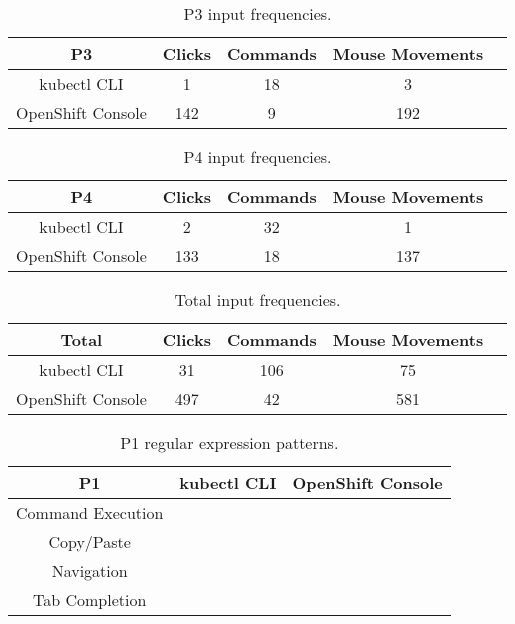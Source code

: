 \documentclass[11pt, oneside]{article}   	%
\begin{document}
\begin{table}
 \centering
  \begin{tabular}{ | c | c | c | c | c | } 
  \hline
  P3 & Clicks & Commands & Mouse Movements \\ 
  \hline
  kubectl CLI & 1 & 18 & 3 \\ 
  \hline
  OpenShift Console & 142 & 9 & 192 \\ 
  \hline
  \end{tabular}
 \caption{P3 input frequencies.}
 \label{table:t3}
\end{table}

\begin{table}
 \centering
  \begin{tabular}{ | c | c | c | c | c | } 
  \hline
  P4 & Clicks & Commands & Mouse Movements \\ 
  \hline
  kubectl CLI & 2 & 32 & 1 \\ 
  \hline
  OpenShift Console & 133 & 18 & 137 \\ 
  \hline
  \end{tabular}
 \caption{P4 input frequencies.}
 \label{table:t4}
\end{table}

\begin{table}
 \centering
  \begin{tabular}{ | c | c | c | c | c | } 
  \hline
  Total & Clicks & Commands & Mouse Movements \\ 
  \hline
  kubectl CLI & 31 & 106 & 75 \\ 
  \hline
  OpenShift Console & 497 & 42 & 581 \\ 
  \hline
  \end{tabular}
 \caption{Total input frequencies.}
 \label{table:t5}
\end{table}

\begin{table}
 \centering
  \begin{tabular}{ | c | c | c | } 
  \hline
  P1 & kubectl CLI & OpenShift Console \\ 
  \hline
  Command Execution &  &  \\ 
  \hline
  Copy/Paste & & \\
  \hline
  Navigation & & \\
  \hline
  Tab Completion & & \\
  \hline
  \end{tabular}
 \caption{P1 regular expression patterns.}
\end{table}
\end{document}
